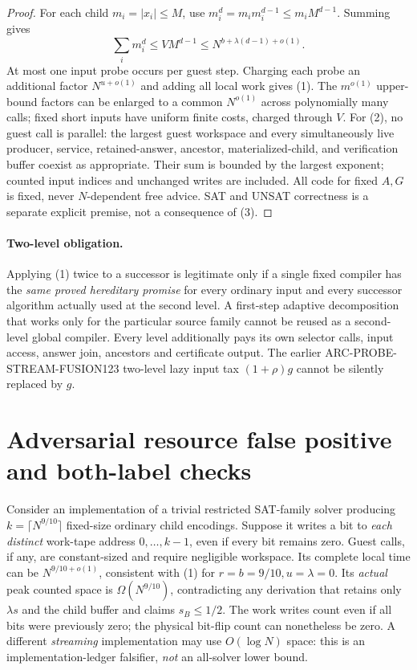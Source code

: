 \documentclass[11pt]{article}
\begin{document}
\begin{proof}
For each child $m_i=|x_i|\le M$, use
$m_i^d=m_i m_i^{d-1}\le m_i M^{d-1}$.
Summing gives
\[
 \sum_i m_i^d\le VM^{d-1}
 \le N^{b+\lambda(d-1)+o(1)}. \tag{3}
\]
At most one input probe occurs per guest step. Charging each probe
an additional factor $N^{u+o(1)}$ and adding all local work gives (1).
The $m^{o(1)}$ upper-bound factors can be enlarged to a common
$N^{o(1)}$ across polynomially many calls; fixed short inputs have
uniform finite costs, charged through $V$. For (2), no guest call is
parallel: the largest guest workspace and every simultaneously live
producer, service, retained-answer, ancestor, materialized-child,
and verification buffer coexist as appropriate. Their sum is bounded
by the largest exponent; counted input indices and unchanged writes
are included. All code for fixed $A,G$ is fixed, never $N$-dependent
free advice. SAT and UNSAT correctness is a separate explicit premise,
not a consequence of (3).
\end{proof}

\paragraph{Two-level obligation.}
Applying (1) twice to a successor is legitimate only if a single fixed
compiler has the \emph{same proved hereditary promise} for every
ordinary input and every successor algorithm actually used at the
second level. A first-step adaptive decomposition that works only for
the particular source family cannot be reused as a second-level
global compiler. Every level additionally pays its own selector calls,
input access, answer join, ancestors and certificate output.
The earlier ARC-PROBE-STREAM-FUSION123 two-level lazy input tax
$(1+\rho)g$ cannot be silently replaced by $g$.

\section{Adversarial resource false positive and both-label checks}
Consider an implementation of a trivial restricted SAT-family solver
producing $k=\lceil N^{9/10}\rceil$ fixed-size ordinary child encodings.
Suppose it writes a bit to \emph{each distinct} work-tape address
$0,\ldots,k-1$, even if every bit remains zero. Guest calls, if any,
are constant-sized and require negligible workspace. Its complete
local time can be $N^{9/10+o(1)}$, consistent with (1) for
$r=b=9/10,u=\lambda=0$.
Its \emph{actual} peak counted space is
$\Omega(N^{9/10})$, contradicting any derivation that retains only
$\lambda s$ and the child buffer and claims $s_B\le1/2$.
The work writes count even if all bits were previously zero;
the physical bit-flip count can nonetheless be zero.
A different \emph{streaming} implementation may use $O(\log N)$ space:
this is an implementation-ledger falsifier, \emph{not} an all-solver
lower bound.
\end{document}
